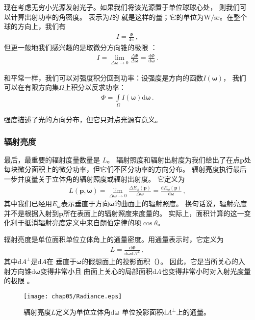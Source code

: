 现在考虑无穷小光源发射光子。如果我们将该光源置于单位球球心处，
则我们可以计算出射功率的角密度。
表示为$I$的
就是这样的量；它的单位为$\text{W}/\text{sr}$。在整个球的方向上，我们有
\begin{align*}
    I=\frac{\varPhi}{4\pi}\, ,
\end{align*}
但更一般地我们感兴趣的是取微分方向锥的极限
：
\begin{align*}
    I=\lim\limits_{\Delta{\bm\omega}\rightarrow 0}{\frac{\Delta\varPhi}{\Delta{\bm\omega}}}=\frac{\mathrm{d}\varPhi}{\mathrm{d}{\bm\omega}}\, .
\end{align*}

和平常一样，我们可以对强度积分回到功率：设强度是方向的函数$I({\bm\omega})$，
我们可以在有限方向集$\Omega$上积分以反求功率：
\begin{align*}
    \varPhi=\int\limits_{\Omega}I({\bm\omega})\mathrm{d}{\bm\omega}\, .
\end{align*}

强度描述了光的方向分布，但它只对点光源有意义。

\subsubsection*{辐射亮度}
最后，最重要的辐射度量数量是
$L$。
辐射照度和辐射出射度为我们给出了在点$\bm p$处
每块微分面积上的微分功率，但它们不区分功率的方向分布。
辐射亮度执行最后一步并度量关于立体角的辐射照度或辐射出射度。
它定义为
\begin{align*}
    L({\bm p},{\bm\omega})=\lim\limits_{\Delta{\bm\omega}\rightarrow 0}{\frac{\Delta E_{\bm\omega}({\bm p})}{\Delta{\bm\omega}}}=\frac{\mathrm{d}E_{\bm\omega}({\bm p})}{\mathrm{d}{\bm\omega}}\, ,
\end{align*}
其中我们已经用$ E_{\bm\omega}$表示垂直于方向$\bm\omega$的曲面上的辐射照度。
换句话说，辐射亮度并不是根据入射到$\bm p$所在表面上的辐射照度来度量的。
实际上，面积计算的这一变化利于抵消辐射亮度定义中来自朗伯定律的项$\cos\theta$。

辐射亮度是单位面积单位立体角上的通量密度。用通量表示时，它定义为
\begin{align*}
    L=\frac{\mathrm{d}\varPhi}{\mathrm{d}{\bm\omega}\mathrm{d}A^{\perp}}\, ,
\end{align*}
其中$\mathrm{d}A^{\perp}$是$\mathrm{d}A$在
垂直于$\bm\omega$的假想面上的投影面积（）。
因此，它是当所关心的入射方向锥$\mathrm{d}{\bm\omega}$变得非常小且
曲面上关心的局部面积$\mathrm{d}A$也变得非常小时对入射光度量的极限
。
\begin{figure}[htbp]
    \centering\texttt{[image: chap05/Radiance.eps]}
    \caption{辐射亮度$L$定义为单位立体角$\mathrm{d}{\bm\omega}$
    单位投影面积$\mathrm{d}A^{\perp}$上的通量。}
    \label{fig:5.10}
\end{figure}

